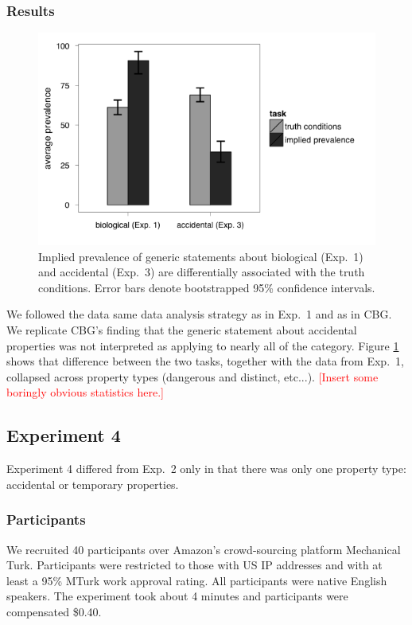 \documentclass[10pt,letterpaper]{article}
\newcommand{\red}[1]{\textcolor{Red}{#1}}
\begin{document}
\subsubsection{Results}

\begin{figure}
\centering
    \includegraphics[width=0.8\columnwidth]{exp3_asymmetry}
    \caption{Implied prevalence of generic statements about biological (Exp.~1) and accidental (Exp.~3) are differentially associated with the truth conditions. Error bars denote bootstrapped 95\% confidence intervals.}
  \label{fig:exp3_asymm}
\end{figure}


We followed the data same data analysis strategy as in Exp.~1 and as in CBG. We replicate CBG's finding that the generic statement about accidental properties was not interpreted as applying to nearly all of the category. Figure \ref{fig:exp3_asymm} shows that difference between the two tasks, together with the data from Exp.~1, collapsed across property types (dangerous and distinct, etc...). \red{[Insert some boringly obvious statistics here.]}



\subsection{Experiment 4}

Experiment 4 differed from Exp.~2 only in that there was only one property type: accidental or temporary properties. 

\subsubsection{Participants}

We recruited 40 participants over Amazon's crowd-sourcing platform Mechanical Turk. Participants were restricted to those with US IP addresses and with at least a 95\% MTurk work approval rating. All participants were native English speakers. The experiment took about 4 minutes and participants were compensated \$0.40.
\end{document}
